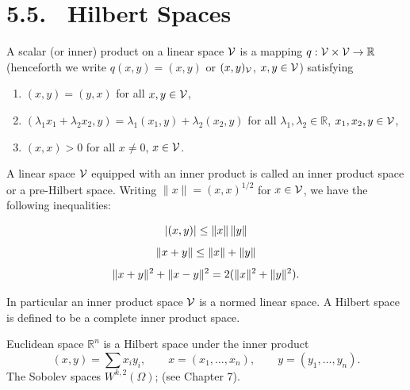 \section*{5.5. \ Hilbert Spaces}

\begin{definition}\label{gt.def5.5.inner-product}
A scalar (or inner) product on a linear space $\V$ is a mapping $q:\V\times\V\to \mathbb{R}$ (henceforth we write $q(x, y)=(x, y)$ or $(x, y)_{\V}$, $x, y\in\V$) satisfying
\begin{enumerate}
\item[(i)] $(x, y)=(y, x)$ for all $x, y\in\V$,
\item[(ii)] $(\lambda_1x_1+\lambda_2x_2, y)=\lambda_1(x_1, y)+\lambda_2(x_2, y)$ for all $\lambda_1, \lambda_2\in\mathbb{R}$, $x_1, x_2, y\in\V$,
\item[(iii)] $(x, x)>0$ for all $x\neq 0$, $x\in\V$.
\end{enumerate}
A linear space $\V$ equipped with an inner product is called an inner product space or a pre-Hilbert space. Writing $\|x\|=(x, x)^{1/2}$ for $x\in\V$, we have the following inequalities:
\end{definition}

\begin{equation}\label{gt.eq5.7}\dcref{(5.7)}\group{chapter-5}\source{gilbarg-trudinger:page-0092}
|(x, y)|\leq \|x\|\,\|y\|
\end{equation}
\begin{equation}\label{gt.eq5.8}\dcref{(5.8)}\group{chapter-5}\source{gilbarg-trudinger:page-0092}
\|x+y\|\leq \|x\|+\|y\|
\end{equation}
\begin{equation}\label{gt.eq5.9}\dcref{(5.9)}\group{chapter-5}\source{gilbarg-trudinger:page-0092}
\|x+y\|^2+\|x-y\|^2=2(\|x\|^2+\|y\|^2).
\end{equation}

\begin{definition}\label{gt.def5.5.hilbert-space}
In particular an inner product space $\V$ is a normed linear space. A Hilbert space is defined to be a complete inner product space.
\end{definition}

\begin{example}
Euclidean space $\mathbb{R}^n$ is a Hilbert space under the inner product
\[
(x,y)=\sum x_i y_i,\qquad x=(x_1,\dots,x_n),\qquad y=(y_1,\dots,y_n).
\]
The Sobolev spaces $W^{k,2}(\Omega)$; (see Chapter 7).
\end{example}

